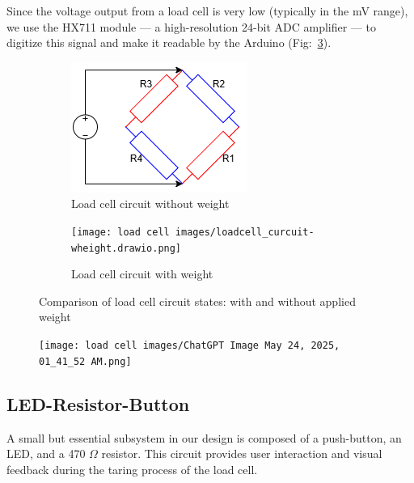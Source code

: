 Since the voltage output from a load cell is very low (typically in the mV range), we use the HX711 module — a high-resolution 24-bit ADC amplifier — to digitize this signal and make it readable by the Arduino (Fig:~\ref{fig:loadcell-circuit-comparison}).
\begin{figure}[H]
    \centering
    \begin{subfigure}[b]{0.45\linewidth}
        \centering
        \includegraphics[width=\linewidth]{load cell images/loadcell_curcuit-.drawio.png}
        \caption{Load cell circuit without weight}
        \label{fig:loadcell-weight}
    \end{subfigure}
    \hfill
    \begin{subfigure}[b]{0.45\linewidth}
        \centering
        \texttt{[image: load cell images/loadcell\_curcuit-wheight.drawio.png]}
        \caption{Load cell circuit with weight}
        \label{fig:loadcell-noweight}
    \end{subfigure}
    \caption{Comparison of load cell circuit states: with and without applied weight}
    \label{fig:loadcell-circuit-comparison}
\end{figure}


\begin{figure}[H]
    \centering
    \texttt{[image: load cell images/ChatGPT Image May 24, 2025, 01\_41\_52 AM.png]}
    \caption{}
    \label{fig:enter-label}
\end{figure}

\subsection{LED-Resistor-Button}
A small but essential subsystem in our design is composed of a push-button, an LED, and a 470 $\Omega$ resistor. This circuit provides user interaction and visual feedback during the taring process of the load cell.


